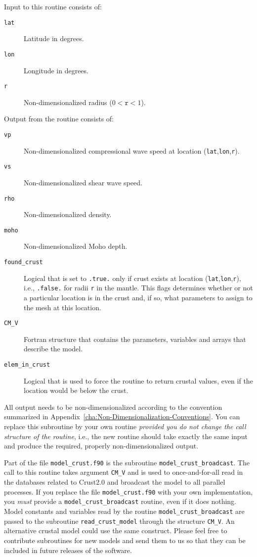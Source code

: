 \noindent
Input to this routine consists of:
\begin{description}
\item [{\texttt{lat}}] Latitude in degrees.
\item [{\texttt{lon}}] Longitude in degrees.
\item [{\texttt{r}}] Non-dimensionalized radius ($0<\texttt{r}<1$).
\end{description}
%
Output from the routine consists of:
\begin{description}
\item [{\texttt{vp}}] Non-dimensionalized compressional wave speed at location
(\texttt{lat},\texttt{lon},\texttt{r}).
\item [{\texttt{vs}}] Non-dimensionalized shear wave speed.
\item [{\texttt{rho}}] Non-dimensionalized density.
\item [{\texttt{moho}}] Non-dimensionalized Moho depth.
\item [{\texttt{found\_crust}}] Logical that is set to \texttt{.true.}
only if crust exists at location (\texttt{lat},\texttt{lon},\texttt{r}),
i.e., \texttt{.false.} for radii \texttt{r} in the mantle. This flags
determines whether or not a particular location is in the crust and,
if so, what parameters to assign to the mesh at this location.
\item [{\texttt{CM\_V}}] Fortran structure that contains the parameters,
variables and arrays that describe the model.
\item [{\texttt{elem\_in\_crust}}] Logical that is used to force the
routine to return crustal values, even if the location would
be below the crust.
\end{description}
All output needs to be non-dimensionalized according to the convention
summarized in Appendix~\ref{cha:Non-Dimensionalization-Conventions}.
You can replace this subroutine by your own routine \textit{provided
you do not change the call structure of the routine}, i.e., the new
routine should take exactly the same input and produce the required,
properly non-dimensionalized output.

Part of the file \texttt{model\_crust.f90} is the subroutine \texttt{model\_crust\_broadcast}.
The call to this routine takes argument \texttt{CM\_V} and is used
to once-and-for-all read in the databases related to Crust2.0 and
broadcast the model to all parallel processes. If
you replace the file \texttt{model\_crust.f90} with your own implementation,
you \textit{must} provide a \texttt{model\_crust\_broadcast} routine,
even if it does nothing. Model constants and variables read by the
routine \texttt{model\_crust\_broadcast} are passed to the subroutine
\texttt{read\_crust\_model} through the structure \texttt{CM\_V}.
An alternative crustal model could use the same construct. Please
feel free to contribute subroutines for new models and send them to
us so that they can be included in future releases of the software.

